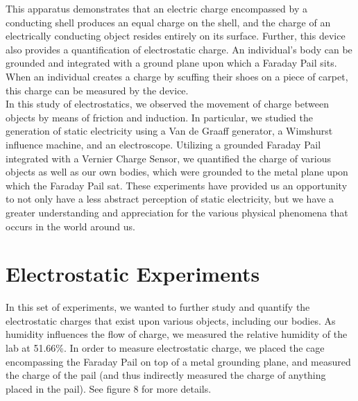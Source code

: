 \documentclass[oneside,12pt]{amsart}
\begin{document}
\indent This apparatus demonstrates that an electric charge encompassed by a conducting shell produces an equal charge on the shell, and the charge of an electrically conducting object resides entirely on its surface. Further, this device also provides a quantification of electrostatic charge. An individual’s body can be grounded and integrated with a ground plane upon which a Faraday Pail sits. When an individual creates a charge by scuffing their shoes on a piece of carpet, this charge can be measured by the device.\\

\indent In this study of electrostatics, we observed the movement of charge between objects by means of friction and induction. In particular, we studied the generation of static electricity using a Van de Graaff generator, a Wimshurst influence machine, and an electroscope. Utilizing a grounded Faraday Pail integrated with a Vernier Charge Sensor, we quantified the charge of various objects as well as our own bodies, which were grounded to the metal plane upon which the Faraday Pail sat. These experiments have provided us an opportunity to not only have a less abstract perception of static electricity, but we have a greater understanding and appreciation for the various physical phenomena that occurs in the world around us.

\section{Electrostatic Experiments}
\indent In this set of experiments, we wanted to further study and quantify the electrostatic charges that exist upon various objects, including our bodies. As humidity influences the flow of charge, we measured the relative humidity of the lab at 51.66\%. In order to measure electrostatic charge, we placed the cage encompassing the Faraday Pail on top of a metal grounding plane, and measured the charge of the pail (and thus indirectly measured the charge of anything placed in the pail). See figure 8 for more details. \\
\end{document}

